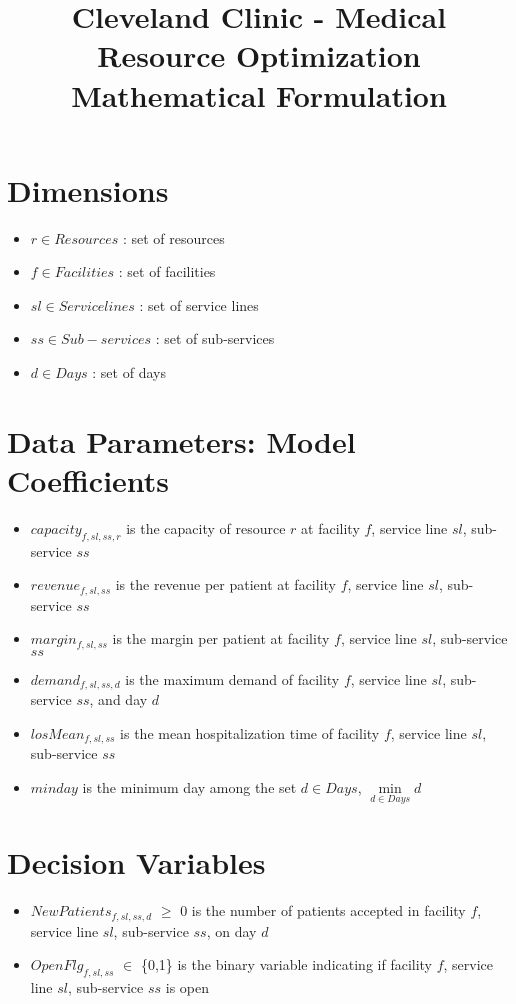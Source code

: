 \documentclass[10pt, letterpaper]{article}
\begin{document}
\title{Cleveland Clinic - Medical Resource Optimization Mathematical Formulation}
\maketitle


\section*{Dimensions}
\begin{itemize}
\item[ ] $ r \in Resources$ : set of resources
\item[ ] $ f \in Facilities$ : set of facilities
\item[ ] $ sl \in Service lines$ : set of service lines
\item[ ] $ ss \in Sub-services$ : set of sub-services
\item[ ] $ d \in Days$ : set of days
\end{itemize}

\section*{Data Parameters: Model Coefficients}
\begin{itemize}
\item[ ] $capacity_{f,sl,ss,r}$  is the capacity of resource $r$ at facility $f$, service line $sl$, sub-service $ss$
\item[ ] $revenue_{f,sl,ss}$  is the revenue per patient at facility $f$, service line $sl$, sub-service $ss$
\item[ ] $margin_{f,sl,ss}$  is the margin per patient at facility $f$, service line $sl$, sub-service $ss$
\item[ ] $demand_{f,sl,ss,d}$  is the maximum demand of facility $f$, service line $sl$, sub-service $ss$, and day $d$
\item[ ] $losMean_{f,sl,ss}$  is the mean hospitalization time of facility $f$, service line $sl$, sub-service $ss$
\item[ ] $minday$ is the minimum day among the set $ d \in Days$, ${\min\limits_{d \in Days} d}$
\end{itemize}

\section*{Decision Variables}
\begin{itemize}
\item [ ] $NewPatients_{f,sl,ss,d}$ $\geq$ {0} is the number of patients accepted in facility $f$, service line $sl$, sub-service $ss$, on day $d$
\item [ ] $OpenFlg_{f,sl,ss}$ $\in$ \{0,1\} is the binary variable indicating if facility $f$, service line $sl$, sub-service $ss$ is open
\end{itemize}
\end{document}
